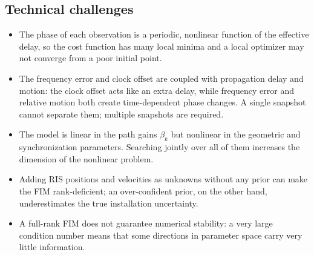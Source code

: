 \documentclass[11pt,a4paper]{article}
\begin{document}
\subsection{Technical challenges}
\begin{itemize}
\item The phase of each observation is a periodic, nonlinear function of the effective delay, so the cost
function has many local minima and a local optimizer may not converge from a poor initial point.
\item The frequency error and clock offset are coupled with propagation delay and motion: the clock offset acts
like an extra delay, while frequency error and relative motion both create time-dependent phase changes. A single
snapshot cannot separate them; multiple snapshots are required.
\item The model is linear in the path gains $\beta_k$ but nonlinear in the geometric and synchronization
parameters. Searching jointly over all of them increases the dimension of the nonlinear problem.
\item Adding RIS positions and velocities as unknowns without any prior can make the FIM rank-deficient; an
over-confident prior, on the other hand, underestimates the true installation uncertainty.
\item A full-rank FIM does not guarantee numerical stability: a very large condition number means that some
directions in parameter space carry very little information.
\end{itemize}
\end{document}
